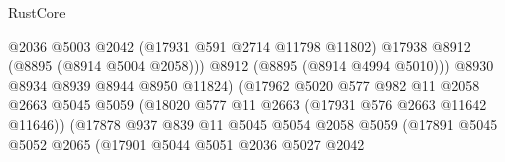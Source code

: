 \begin{lexlean}{RustCore}
\begin{coremodule}
                                                  @2036
                                                  @5003
                                                  @2042
                                                  (@17931 @591 @2714 @11798 @11802)
                                                  @17938
                                                  @8912
                                                  (@8895 (@8914 @5004 @2058)))
                                                @8912
                                                (@8895 (@8914 @4994 @5010)))
                                              @8930
                                              @8934
                                              @8939
                                              @8944
                                              @8950
                                              @11824)
                                            (@17962
                                              @5020
                                              @577
                                              @982
                                              @11
                                              @2058
                                              @2663
                                              @5045
                                              @5059
                                              (@18020
                                                @577
                                                @11
                                                @2663
                                                (@17931 @576 @2663 @11642 @11646))
                                              (@17878
                                                @937
                                                @839
                                                @11
                                                @5045
                                                @5054
                                                @2058
                                                @5059
                                                (@17891
                                                  @5045
                                                  @5052
                                                  @2065
                                                  (@17901
                                                    @5044
                                                    @5051
                                                    @2036
                                                    @5027
                                                    @2042

\end{coremodule}
\end{lexlean}
